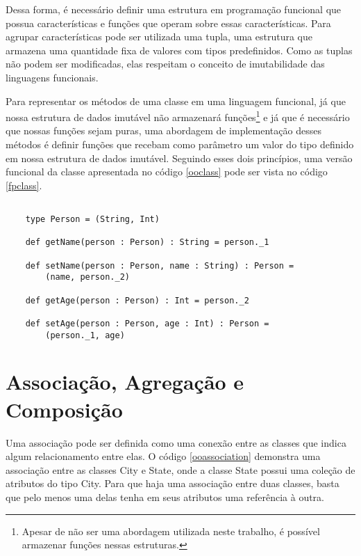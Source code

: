 Dessa forma, é necessário definir uma estrutura em 
programação funcional que possua características e 
funções que operam sobre essas características. 
Para agrupar características pode ser utilizada uma 
tupla, uma estrutura que armazena uma quantidade 
fixa de valores com tipos predefinidos\cite{tuplesscala}. 
Como as tuplas não podem ser modificadas, elas 
respeitam o conceito de imutabilidade das 
linguagens funcionais.

Para representar os métodos de uma classe em uma 
linguagem funcional, já que nossa estrutura de dados 
imutável não armazenará funções\footnote{Apesar de não 
ser uma abordagem utilizada neste trabalho, é 
possível armazenar funções nessas estruturas.} e já 
que é necessário que nossas funções sejam puras, 
uma abordagem de implementação desses 
métodos é definir funções que recebam 
como parâmetro um valor do tipo definido em nossa 
estrutura de dados imutável. Seguindo esses dois 
princípios, uma versão funcional da classe apresentada 
no código \ref{ooclass} pode ser vista no código \ref{fpclass}.


\begin{lstlisting}[caption={Representação de uma classe no contexto funcional},label=fpclass]
    
    type Person = (String, Int)

    def getName(person : Person) : String = person._1 

    def setName(person : Person, name : String) : Person = 
        (name, person._2)

    def getAge(person : Person) : Int = person._2

    def setAge(person : Person, age : Int) : Person =
        (person._1, age)

\end{lstlisting}

\section{Associação, Agregação e Composição}

Uma associação pode ser definida como uma 
conexão entre as classes que indica algum 
relacionamento entre elas\cite{Sommerville10}. 
O código \ref{ooassociation} demonstra uma 
associação entre as classes City e State, onde 
a classe State possui uma coleção de atributos 
do tipo City. Para que haja uma associação 
entre duas classes, basta que pelo menos 
uma delas tenha em seus atributos uma 
referência à outra.

